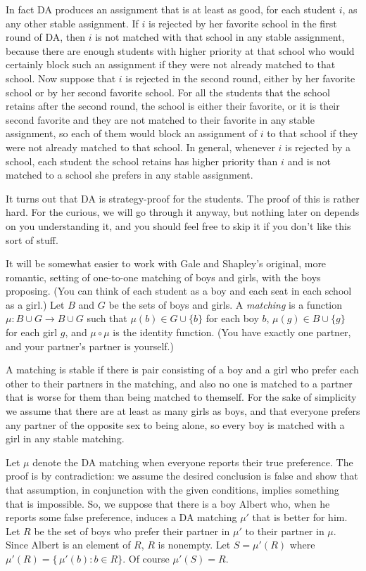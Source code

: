 \documentclass[12pt]{article}
\theoremstyle{definition}
\begin{document}
In fact DA produces an assignment that is at least as good, for each
student $i$, as any other stable assignment.  If $i$ is rejected by
her favorite school in the first round of DA, then $i$ is not matched
with that school in any stable assignment, because there are enough
students with higher priority at that school who would certainly block
such an assignment if they were not already matched to that school.
Now suppose that $i$ is rejected in the second round, either by her
favorite school or by her second favorite school.  For all the
students that the school retains after the second round, the school is
either their favorite, or it is their second favorite and they are not
matched to their favorite in any stable assignment, so each of them
would block an assignment of $i$ to that school if they were not
already matched to that school.  In general, whenever $i$ is rejected
by a school, each student the school retains has higher priority than
$i$ and is not matched to a school she prefers in any stable
assignment.

It turns out that DA is strategy-proof for the students.  The proof of
this is rather hard.  For the curious, we will go through it anyway,
but nothing later on depends on you understanding it, and you should
feel free to skip it if you don't like this sort of stuff.

It will be somewhat easier to work with Gale and Shapley's original,
more romantic, setting of one-to-one matching of boys and girls, with
the boys proposing.  (You can think of each student as a boy and each
seat in each school as a girl.)  Let $B$ and $G$ be the sets of boys
and girls.  A \emph{matching} is a function $\mu \colon B \cup G \to B
\cup G$ such that $\mu(b) \in G \cup \{b\}$ for each boy $b$, $\mu(g)
\in B \cup \{g\}$ for each girl $g$, and $\mu \circ \mu$ is the
identity function.  (You have exactly one partner, and your partner's
partner is yourself.)

A matching is stable if there is pair consisting of a boy and a girl
who prefer each other to their partners in the matching, and also no
one is matched to a partner that is worse for them than being matched
to themself.  For the sake of simplicity we assume that there are at
least as many girls as boys, and that everyone prefers any partner of
the opposite sex to being alone, so every boy is matched with a girl
in any stable matching.

Let $\mu$ denote the DA matching when everyone reports their true
preference.  The proof is by contradiction: we assume the desired
conclusion is false and show that that assumption, in conjunction with
the given conditions, implies something that is impossible.  So, we
suppose that there is a boy Albert who, when he reports some false
preference, induces a DA matching $\mu'$ that is better for him.  Let
$R$ be the set of boys who prefer their partner in $\mu'$ to their
partner in $\mu$.  Since Albert is an element of $R$, $R$ is nonempty.
Let $S = \mu'(R)$ where $\mu'(R) = \{\, \mu'(b) : b \in R \}$.  Of
course $\mu'(S) = R$.
\end{document}

